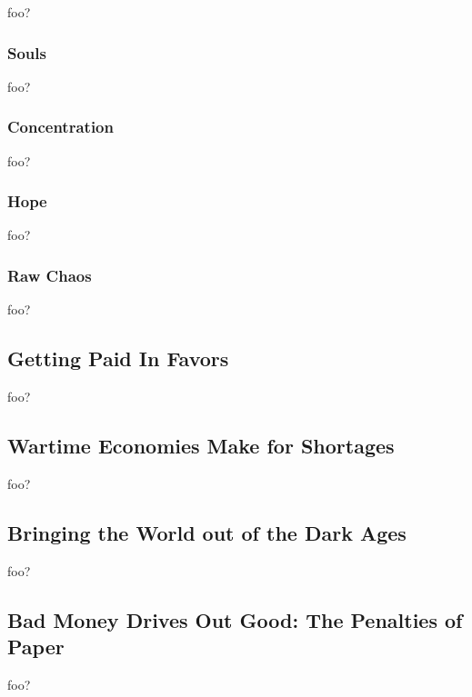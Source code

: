 foo?

\subsubsection{Souls}

foo?

\subsubsection{Concentration}

foo?

\subsubsection{Hope}

foo?

\subsubsection{Raw Chaos}

foo?

\subsection{Getting Paid In Favors}

foo?

\subsection{Wartime Economies Make for Shortages}

foo?

\subsection{Bringing the World out of the Dark Ages}

foo?

\subsection{Bad Money Drives Out Good: The Penalties of Paper}

foo?

